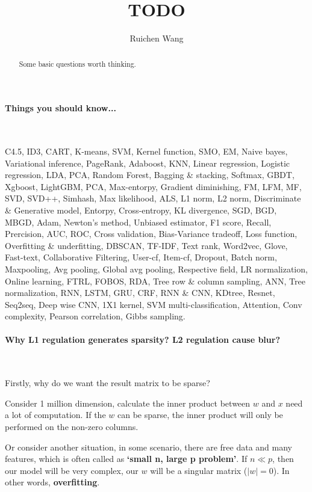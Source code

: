 \documentclass{article}
\author{Ruichen Wang}
\title{TODO}
\begin{document}
\maketitle
\begin{abstract}
Some basic questions worth thinking.
\end{abstract}
\noindent
\paragraph{Things you should know...}~{}

C4.5, ID3, CART, K-means, SVM, Kernel function, SMO, EM, Naive bayes, Variational inference, PageRank, Adaboost, KNN,  Linear regression, Logistic regression, LDA, PCA, Random Forest, Bagging \& stacking, Softmax, GBDT, Xgboost, LightGBM, PCA, Max-entorpy, Gradient diminishing, FM, LFM, MF, SVD, SVD++, Simhash, Max likelihood, ALS, L1 norm, L2 norm, Discriminate \& Generative model, Entorpy, Cross-entropy, KL divergence, SGD, BGD, MBGD, Adam, Newton's method, Unbiased estimator, F1 score, Recall, Prercision, AUC, ROC, Cross validation, Bias-Variance tradeoff, Loss function, Overfitting \& underfitting, DBSCAN, TF-IDF, Text rank, Word2vec, Glove, Fast-text, Collaborative Filtering, User-cf, Item-cf, Dropout, Batch norm, Maxpooling, Avg pooling, Global avg pooling, Respective field, LR normalization, Online learning, FTRL, FOBOS, RDA, Tree row \& column sampling,  ANN, Tree normalization, RNN, LSTM, GRU, CRF, RNN \& CNN, KDtree, Resnet, Seq2seq, Deep wise CNN, 1X1 kernel, SVM multi-classification, Attention, Conv complexity, Pearson correlation, Gibbs sampling.


\paragraph{Why L1 regulation generates sparsity? L2 regulation cause blur?}~{}

Firstly, why do we want the result matrix to be sparse?

Consider 1 million dimension, calculate the inner product between $w$ and $x$ need a lot of computation. If the $w$ can be sparse, the inner product will only be performed on the non-zero columns.

Or consider another situation, in some scenario, there are free data and many features, which is often called as \textbf{`small n, large p problem'}. If $n \ll p $, then our model will be very complex, our $w$ will be a singular matrix ($|w|=0$). In other words, \textbf{overfitting}.
\end{document}
